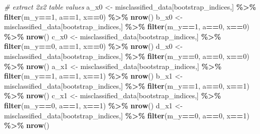 \documentclass[
]{book}
\newenvironment{Shaded}{\begin{snugshade}}{\end{snugshade}}
\newcommand{\CommentTok}[1]{\textcolor[rgb]{0.56,0.35,0.01}{\textit{#1}}}
\newcommand{\DecValTok}[1]{\textcolor[rgb]{0.00,0.00,0.81}{#1}}
\newcommand{\FunctionTok}[1]{\textcolor[rgb]{0.13,0.29,0.53}{\textbf{#1}}}
\newcommand{\NormalTok}[1]{#1}
\newcommand{\OtherTok}[1]{\textcolor[rgb]{0.56,0.35,0.01}{#1}}
\newcommand{\SpecialCharTok}[1]{\textcolor[rgb]{0.81,0.36,0.00}{\textbf{#1}}}
\begin{document}
\begin{Shaded}
\begin{Highlighting}[]
  \CommentTok{\# extract 2x2 table values}
\NormalTok{  a\_x0 }\OtherTok{\textless{}{-}}\NormalTok{ misclassified\_data[bootstrap\_indices,] }\SpecialCharTok{\%\textgreater{}\%} \FunctionTok{filter}\NormalTok{(m\_y}\SpecialCharTok{==}\DecValTok{1}\NormalTok{, a}\SpecialCharTok{==}\DecValTok{1}\NormalTok{, x}\SpecialCharTok{==}\DecValTok{0}\NormalTok{) }\SpecialCharTok{\%\textgreater{}\%} \FunctionTok{nrow}\NormalTok{()}
\NormalTok{  b\_x0 }\OtherTok{\textless{}{-}}\NormalTok{ misclassified\_data[bootstrap\_indices,] }\SpecialCharTok{\%\textgreater{}\%} \FunctionTok{filter}\NormalTok{(m\_y}\SpecialCharTok{==}\DecValTok{1}\NormalTok{, a}\SpecialCharTok{==}\DecValTok{0}\NormalTok{, x}\SpecialCharTok{==}\DecValTok{0}\NormalTok{) }\SpecialCharTok{\%\textgreater{}\%} \FunctionTok{nrow}\NormalTok{()}
\NormalTok{  c\_x0 }\OtherTok{\textless{}{-}}\NormalTok{ misclassified\_data[bootstrap\_indices,] }\SpecialCharTok{\%\textgreater{}\%} \FunctionTok{filter}\NormalTok{(m\_y}\SpecialCharTok{==}\DecValTok{0}\NormalTok{, a}\SpecialCharTok{==}\DecValTok{1}\NormalTok{, x}\SpecialCharTok{==}\DecValTok{0}\NormalTok{) }\SpecialCharTok{\%\textgreater{}\%} \FunctionTok{nrow}\NormalTok{()}
\NormalTok{  d\_x0 }\OtherTok{\textless{}{-}}\NormalTok{ misclassified\_data[bootstrap\_indices,] }\SpecialCharTok{\%\textgreater{}\%} \FunctionTok{filter}\NormalTok{(m\_y}\SpecialCharTok{==}\DecValTok{0}\NormalTok{, a}\SpecialCharTok{==}\DecValTok{0}\NormalTok{, x}\SpecialCharTok{==}\DecValTok{0}\NormalTok{) }\SpecialCharTok{\%\textgreater{}\%} \FunctionTok{nrow}\NormalTok{()}
\NormalTok{  a\_x1 }\OtherTok{\textless{}{-}}\NormalTok{ misclassified\_data[bootstrap\_indices,] }\SpecialCharTok{\%\textgreater{}\%} \FunctionTok{filter}\NormalTok{(m\_y}\SpecialCharTok{==}\DecValTok{1}\NormalTok{, a}\SpecialCharTok{==}\DecValTok{1}\NormalTok{, x}\SpecialCharTok{==}\DecValTok{1}\NormalTok{) }\SpecialCharTok{\%\textgreater{}\%} \FunctionTok{nrow}\NormalTok{()}
\NormalTok{  b\_x1 }\OtherTok{\textless{}{-}}\NormalTok{ misclassified\_data[bootstrap\_indices,] }\SpecialCharTok{\%\textgreater{}\%} \FunctionTok{filter}\NormalTok{(m\_y}\SpecialCharTok{==}\DecValTok{1}\NormalTok{, a}\SpecialCharTok{==}\DecValTok{0}\NormalTok{, x}\SpecialCharTok{==}\DecValTok{1}\NormalTok{) }\SpecialCharTok{\%\textgreater{}\%} \FunctionTok{nrow}\NormalTok{()}
\NormalTok{  c\_x1 }\OtherTok{\textless{}{-}}\NormalTok{ misclassified\_data[bootstrap\_indices,] }\SpecialCharTok{\%\textgreater{}\%} \FunctionTok{filter}\NormalTok{(m\_y}\SpecialCharTok{==}\DecValTok{0}\NormalTok{, a}\SpecialCharTok{==}\DecValTok{1}\NormalTok{, x}\SpecialCharTok{==}\DecValTok{1}\NormalTok{) }\SpecialCharTok{\%\textgreater{}\%} \FunctionTok{nrow}\NormalTok{()}
\NormalTok{  d\_x1 }\OtherTok{\textless{}{-}}\NormalTok{ misclassified\_data[bootstrap\_indices,] }\SpecialCharTok{\%\textgreater{}\%} \FunctionTok{filter}\NormalTok{(m\_y}\SpecialCharTok{==}\DecValTok{0}\NormalTok{, a}\SpecialCharTok{==}\DecValTok{0}\NormalTok{, x}\SpecialCharTok{==}\DecValTok{1}\NormalTok{) }\SpecialCharTok{\%\textgreater{}\%} \FunctionTok{nrow}\NormalTok{()}
  

\end{Highlighting}
\end{Shaded}
\end{document}
